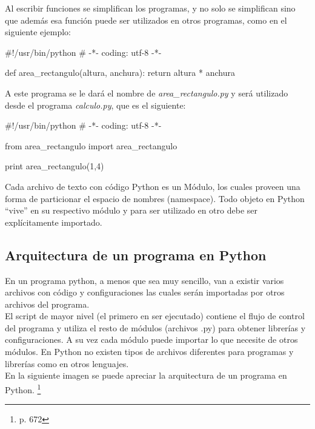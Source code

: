 Al escribir funciones se simplifican los programas, y no solo se simplifican sino que además esa función puede ser utilizados en otros programas, como en el siguiente ejemplo:\\

\begin{pyglist} [language=python]
#!/usr/bin/python
# -*- coding: utf-8 -*-

def area_rectangulo(altura, anchura):
    return altura * anchura
\end{pyglist}

A este programa se le dará el nombre de \textit{area\_rectangulo.py} y será utilizado desde el programa \textit{calculo.py}, que es el siguiente:\\

\begin{pyglist} [language=python]
#!/usr/bin/python
# -*- coding: utf-8 -*-

from area_rectangulo import area_rectangulo

print area_rectangulo(1,4)
\end{pyglist}

Cada archivo de texto con código Python es un Módulo, los cuales proveen una forma de particionar el espacio de nombres (namespace). Todo objeto en Python ``vive'' en su respectivo módulo y para ser utilizado en otro debe ser explícitamente importado.

\subsection{Arquitectura de un programa en Python}

En un programa python, a menos que sea muy sencillo, van a existir varios archivos con código y configuraciones las cuales serán importadas por otros archivos del programa.\\

El script de mayor nivel (el primero en ser ejecutado) contiene el flujo de control del programa y utiliza el resto de módulos (archivos .py) para obtener librerías y configuraciones. A su vez cada módulo puede importar lo que necesite de otros módulos. En Python no existen tipos de archivos diferentes para programas y librerías como en otros lenguajes.\\

En la siguiente imagen se puede apreciar la arquitectura de un programa en Python. \footnote{\cite{Lutz2012} p. 672}

